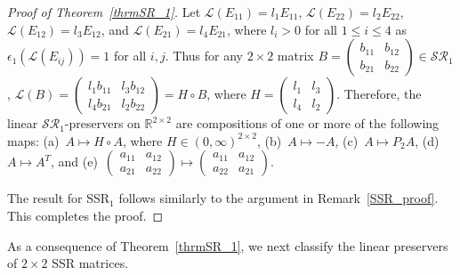 \documentclass[11pt,reqno]{amsart}
\theoremstyle{plain}
\theoremstyle{definition}
\numberwithin{equation}{section}
\begin{document}
\begin{proof}[Proof of Theorem~\ref{thrmSR_1}]
	Let $\mathcal{L}(E_{11})=l_1E_{11}$, $\mathcal{L}(E_{22})=l_2E_{22}$, $\mathcal{L}(E_{12})=l_3E_{12}$, and $\mathcal{L}(E_{21})=l_4E_{21}$, where $l_i>0$ for all $1\leq i\leq4$ as $\epsilon_1(\mathcal{L}(E_{ij}))=1$ for all $i,j$. Thus for any $2\times2$ matrix $B=\begin{pmatrix}
		b_{11} & b_{12} \\
		b_{21} & b_{22}
	\end{pmatrix}\in\mathcal{SR}_1$, $\mathcal{L}(B)=\begin{pmatrix}
		l_1b_{11} & l_3b_{12} \\
		l_4b_{21} & l_2b_{22}
	\end{pmatrix}=H\circ B$, where $H=\begin{pmatrix}
		l_1 & l_3 \\
		l_4 & l_2
	\end{pmatrix}$. Therefore, the linear $\mathcal{SR}_1$-preservers
	on $\mathbb{R}^{2\times2}$ are compositions of one or more of the
	following maps: (a)~$A\mapsto H\circ A$, where $H\in (0,\infty)^{2\times 2}$, (b)~$A\mapsto-A$, (c)~$A\mapsto P_2A$, (d)~$A\mapsto A^T$, and (e)~$\begin{pmatrix}
		a_{11} & a_{12} \\
		a_{21} & a_{22}
	\end{pmatrix}\mapsto\begin{pmatrix}
		a_{11} & a_{12} \\
		a_{22} & a_{21}
	\end{pmatrix}$.
	
	The result for SSR$_1$ follows similarly to the argument in Remark~\ref{SSR_proof}. This completes the proof.
\end{proof}

As a consequence of Theorem~\ref{thrmSR_1}, we next classify the linear preservers of $2\times2$ SSR matrices.
\end{document}

